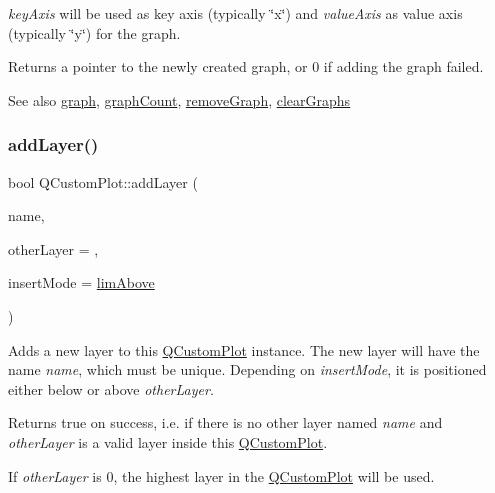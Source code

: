 {\itshape key\+Axis} will be used as key axis (typically \char`\"{}x\char`\"{}) and {\itshape value\+Axis} as value axis (typically \char`\"{}y\char`\"{}) for the graph.

Returns a pointer to the newly created graph, or 0 if adding the graph failed.

\begin{DoxySeeAlso}{See also}
\hyperlink{class_q_custom_plot_a6ecae130f684b25276fb47bd3a5875c6}{graph}, \hyperlink{class_q_custom_plot_a5e1787cdde868c4d3790f9ebc8207d90}{graph\+Count}, \hyperlink{class_q_custom_plot_a903561be895fb6528a770d66ac5e6713}{remove\+Graph}, \hyperlink{class_q_custom_plot_ab0f3abff2d2f7df3668b5836f39207fa}{clear\+Graphs} 
\end{DoxySeeAlso}
\mbox{\label{class_q_custom_plot_ad5255393df078448bb6ac83fa5db5f52}} 
\subsubsection{\texorpdfstring{add\+Layer()}{addLayer()}}
{\footnotesize\ttfamily bool Q\+Custom\+Plot\+::add\+Layer (\begin{DoxyParamCaption}\item[{const Q\+String \&}]{name,  }\item[{\hyperlink{class_q_c_p_layer}{Q\+C\+P\+Layer} $\ast$}]{other\+Layer = {},  }\item[{\hyperlink{class_q_custom_plot_a75a8afbe6ef333b1f3d47abb25b9add7}{Q\+Custom\+Plot\+::\+Layer\+Insert\+Mode}}]{insert\+Mode = {\ttfamily \hyperlink{class_q_custom_plot_a75a8afbe6ef333b1f3d47abb25b9add7a56ffb40bbf81e9b5d869cffc88999a36}{lim\+Above}} }\end{DoxyParamCaption})}

Adds a new layer to this \hyperlink{class_q_custom_plot}{Q\+Custom\+Plot} instance. The new layer will have the name {\itshape name}, which must be unique. Depending on {\itshape insert\+Mode}, it is positioned either below or above {\itshape other\+Layer}.

Returns true on success, i.\+e. if there is no other layer named {\itshape name} and {\itshape other\+Layer} is a valid layer inside this \hyperlink{class_q_custom_plot}{Q\+Custom\+Plot}.

If {\itshape other\+Layer} is 0, the highest layer in the \hyperlink{class_q_custom_plot}{Q\+Custom\+Plot} will be used.

